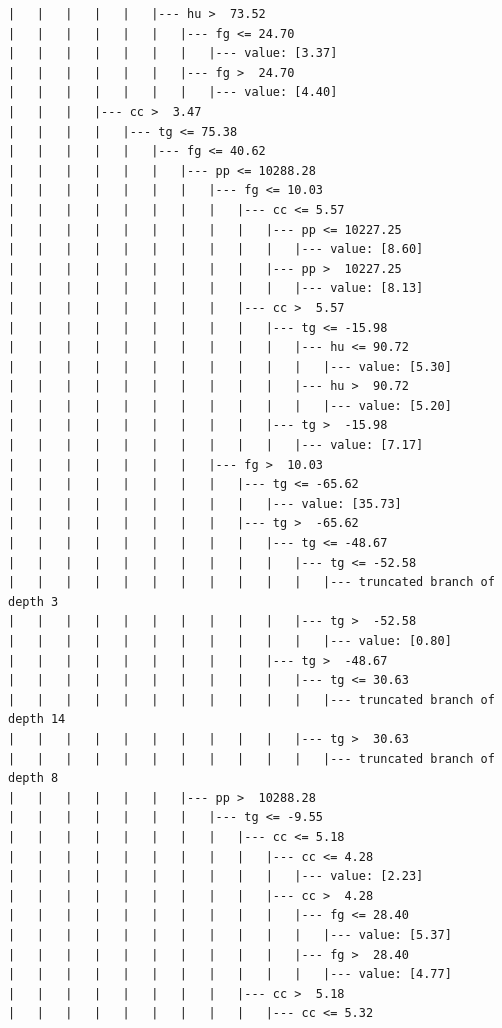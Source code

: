 \documentclass[UTF8, a4paper]{ctexart}
\begin{document}
\begin{lstlisting}
|   |   |   |   |   |--- hu >  73.52
|   |   |   |   |   |   |--- fg <= 24.70
|   |   |   |   |   |   |   |--- value: [3.37]
|   |   |   |   |   |   |--- fg >  24.70
|   |   |   |   |   |   |   |--- value: [4.40]
|   |   |   |--- cc >  3.47
|   |   |   |   |--- tg <= 75.38
|   |   |   |   |   |--- fg <= 40.62
|   |   |   |   |   |   |--- pp <= 10288.28
|   |   |   |   |   |   |   |--- fg <= 10.03
|   |   |   |   |   |   |   |   |--- cc <= 5.57
|   |   |   |   |   |   |   |   |   |--- pp <= 10227.25
|   |   |   |   |   |   |   |   |   |   |--- value: [8.60]
|   |   |   |   |   |   |   |   |   |--- pp >  10227.25
|   |   |   |   |   |   |   |   |   |   |--- value: [8.13]
|   |   |   |   |   |   |   |   |--- cc >  5.57
|   |   |   |   |   |   |   |   |   |--- tg <= -15.98
|   |   |   |   |   |   |   |   |   |   |--- hu <= 90.72
|   |   |   |   |   |   |   |   |   |   |   |--- value: [5.30]
|   |   |   |   |   |   |   |   |   |   |--- hu >  90.72
|   |   |   |   |   |   |   |   |   |   |   |--- value: [5.20]
|   |   |   |   |   |   |   |   |   |--- tg >  -15.98
|   |   |   |   |   |   |   |   |   |   |--- value: [7.17]
|   |   |   |   |   |   |   |--- fg >  10.03
|   |   |   |   |   |   |   |   |--- tg <= -65.62
|   |   |   |   |   |   |   |   |   |--- value: [35.73]
|   |   |   |   |   |   |   |   |--- tg >  -65.62
|   |   |   |   |   |   |   |   |   |--- tg <= -48.67
|   |   |   |   |   |   |   |   |   |   |--- tg <= -52.58
|   |   |   |   |   |   |   |   |   |   |   |--- truncated branch of depth 3
|   |   |   |   |   |   |   |   |   |   |--- tg >  -52.58
|   |   |   |   |   |   |   |   |   |   |   |--- value: [0.80]
|   |   |   |   |   |   |   |   |   |--- tg >  -48.67
|   |   |   |   |   |   |   |   |   |   |--- tg <= 30.63
|   |   |   |   |   |   |   |   |   |   |   |--- truncated branch of depth 14
|   |   |   |   |   |   |   |   |   |   |--- tg >  30.63
|   |   |   |   |   |   |   |   |   |   |   |--- truncated branch of depth 8
|   |   |   |   |   |   |--- pp >  10288.28
|   |   |   |   |   |   |   |--- tg <= -9.55
|   |   |   |   |   |   |   |   |--- cc <= 5.18
|   |   |   |   |   |   |   |   |   |--- cc <= 4.28
|   |   |   |   |   |   |   |   |   |   |--- value: [2.23]
|   |   |   |   |   |   |   |   |   |--- cc >  4.28
|   |   |   |   |   |   |   |   |   |   |--- fg <= 28.40
|   |   |   |   |   |   |   |   |   |   |   |--- value: [5.37]
|   |   |   |   |   |   |   |   |   |   |--- fg >  28.40
|   |   |   |   |   |   |   |   |   |   |   |--- value: [4.77]
|   |   |   |   |   |   |   |   |--- cc >  5.18
|   |   |   |   |   |   |   |   |   |--- cc <= 5.32

\end{lstlisting}
\end{document}
